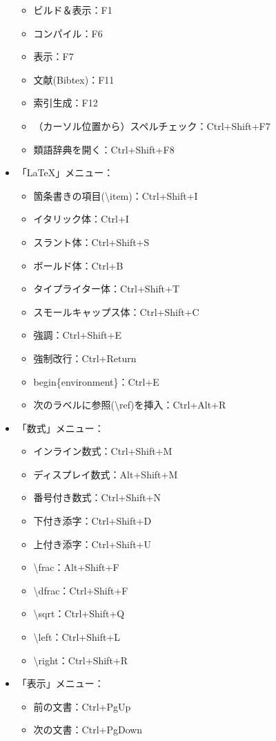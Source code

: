 \documentclass[]{book}
\begin{document}
\begin{itemize}
  \begin{itemize}
  \item
    ビルド＆表示：F1
  \item
    コンパイル：F6
  \item
    表示：F7
  \item
    文献(Bibtex)：F11
  \item
    索引生成：F12
  \item
    （カーソル位置から）スペルチェック：Ctrl+Shift+F7
  \item
    類語辞典を開く：Ctrl+Shift+F8
  \end{itemize}
\item
  「LaTeX」メニュー：

  \begin{itemize}
  \item
    箇条書きの項目(\textbackslash{}item)：Ctrl+Shift+I
  \item
    イタリック体：Ctrl+I
  \item
    スラント体：Ctrl+Shift+S
  \item
    ボールド体：Ctrl+B
  \item
    タイプライター体：Ctrl+Shift+T
  \item
    スモールキャップス体：Ctrl+Shift+C
  \item
    強調：Ctrl+Shift+E
  \item
    強制改行：Ctrl+Return
  \item
    begin\{environment\}：Ctrl+E
  \item
    次のラベルに参照(\textbackslash{}ref)を挿入：Ctrl+Alt+R
  \end{itemize}
\item
  「数式」メニュー：

  \begin{itemize}
  \item
    インライン数式：Ctrl+Shift+M
  \item
    ディスプレイ数式：Alt+Shift+M
  \item
    番号付き数式：Ctrl+Shift+N
  \item
    下付き添字：Ctrl+Shift+D
  \item
    上付き添字：Ctrl+Shift+U
  \item
    \textbackslash{}frac：Alt+Shift+F
  \item
    \textbackslash{}dfrac：Ctrl+Shift+F
  \item
    \textbackslash{}sqrt：Ctrl+Shift+Q
  \item
    \textbackslash{}left：Ctrl+Shift+L
  \item
    \textbackslash{}right：Ctrl+Shift+R
  \end{itemize}
\item
  「表示」メニュー：

  \begin{itemize}
  \item
    前の文書：Ctrl+PgUp
  \item
    次の文書：Ctrl+PgDown
  \end{itemize}
\end{itemize}
\end{document}
